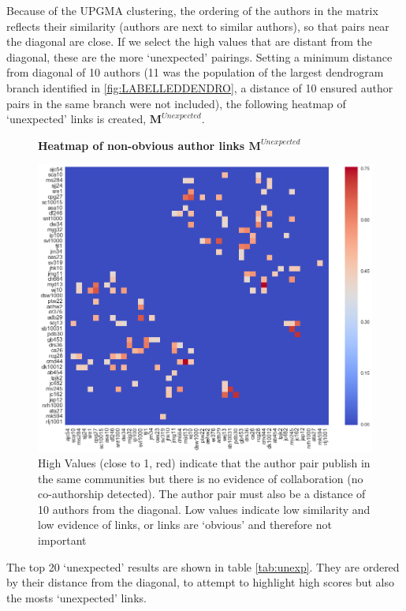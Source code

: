 Because of the UPGMA clustering, the ordering of the authors in the matrix reflects their similarity (authors are next to similar authors), so that pairs near the diagonal are close. If we select the high values that are distant from the diagonal, these are the more `unexpected' pairings. Setting a minimum distance from diagonal of 10 authors (11 was the population of the largest dendrogram branch identified in \ref{fig:LABELLEDDENDRO}, a distance of 10 ensured author pairs in the same branch were not included), the following heatmap of `unexpected' links is created, $\mathbf{M}^{Unexpected}$.
\begin{figure}[H]
    \centering
    \textbf{Heatmap of non-obvious author links $\mathbf{M}^{Unexpected}$}\par\medskip
    \includegraphics[width=\textwidth]{Appendix/Neonicotinoids/Unexpected_Heatmap.png}
    \caption[Heatmap of non-obvious author links $\mathbf{M}^{Unexpected}$]{High Values (close to 1, red) indicate that the author pair publish in the same communities but there is no evidence of collaboration (no co-authorship detected). The author pair must also be a distance of 10 authors from the diagonal. Low values indicate low similarity and low evidence of links, or links are `obvious' and therefore not important}
     \label{fig:ACSBAN}
\end{figure}
The top 20 `unexpected' results are shown in table \ref{tab:unexp}. They are ordered by their distance from the diagonal, to attempt to highlight high scores but also the mosts `unexpected' links.
